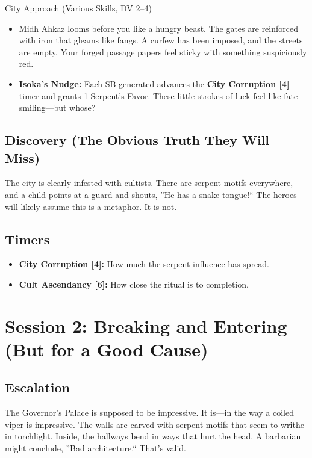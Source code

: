 \documentclass[11pt]{article}
\begin{document}
\begin{mechanicsbox}{City Approach (Various Skills, DV 2--4)}
\begin{itemize}
    \item Midh Ahkaz looms before you like a hungry beast. The gates are reinforced with iron that gleams like fangs. A curfew has been imposed, and the streets are empty. Your forged passage papers feel sticky with something suspiciously red.
    \item \textbf{Isoka's Nudge:} Each SB generated advances the \textbf{City Corruption [4]} timer and grants 1 Serpent's Favor. These little strokes of luck feel like fate smiling---but whose?
\end{itemize}
\end{mechanicsbox}

\subsection*{Discovery (The Obvious Truth They Will Miss)}
The city is clearly infested with cultists. There are serpent motifs everywhere, and a child points at a guard and shouts, ''He has a snake tongue!`` The heroes will likely assume this is a metaphor. It is not.

\subsection*{Timers}
\begin{itemize}
    \item \textbf{City Corruption [4]:} How much the serpent influence has spread.
    \item \textbf{Cult Ascendancy [6]:} How close the ritual is to completion.
\end{itemize}

\section*{Session 2: Breaking and Entering (But for a Good Cause)}

\subsection*{Escalation}
The Governor's Palace is supposed to be impressive. It is---in the way a coiled viper is impressive. The walls are carved with serpent motifs that seem to writhe in torchlight. Inside, the hallways bend in ways that hurt the head. A barbarian might conclude, ''Bad architecture.`` That's valid.
\end{document}
